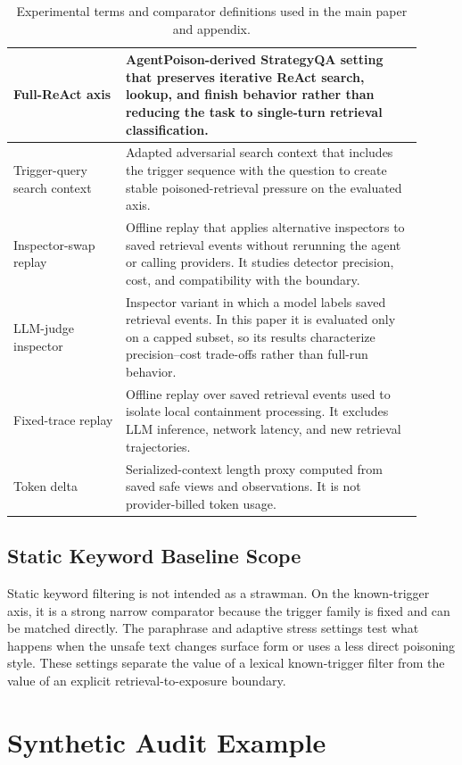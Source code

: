 \documentclass[11pt]{article}
\begin{document}
\begin{table}[t]
\begin{tabular}{L{0.25\linewidth}L{0.66\linewidth}}
\midrule
Full-ReAct axis & AgentPoison-derived StrategyQA setting that preserves iterative ReAct search, lookup, and finish behavior rather than reducing the task to single-turn retrieval classification. \\
\midrule
Trigger-query search context & Adapted adversarial search context that includes the trigger sequence with the question to create stable poisoned-retrieval pressure on the evaluated axis. \\
\midrule
Inspector-swap replay & Offline replay that applies alternative inspectors to saved retrieval events without rerunning the agent or calling providers. It studies detector precision, cost, and compatibility with the boundary. \\
\midrule
LLM-judge inspector & Inspector variant in which a model labels saved retrieval events. In this paper it is evaluated only on a capped subset, so its results characterize precision--cost trade-offs rather than full-run behavior. \\
\midrule
Fixed-trace replay & Offline replay over saved retrieval events used to isolate local containment processing. It excludes LLM inference, network latency, and new retrieval trajectories. \\
Token delta & Serialized-context length proxy computed from saved safe views and observations. It is not provider-billed token usage. \\
\bottomrule
\end{tabular}
\caption{Experimental terms and comparator definitions used in the main paper and appendix.}
\label{tab:app-terminology}
\end{table}

\subsection{Static Keyword Baseline Scope}
\label{app:static-keyword-scope}

Static keyword filtering is not intended as a strawman. On the known-trigger axis, it is a strong narrow comparator because the trigger family is fixed and can be matched directly. The paraphrase and adaptive stress settings test what happens when the unsafe text changes surface form or uses a less direct poisoning style. These settings separate the value of a lexical known-trigger filter from the value of an explicit retrieval-to-exposure boundary.

\section{Synthetic Audit Example}
\label{app:synthetic-audit}
\end{document}
